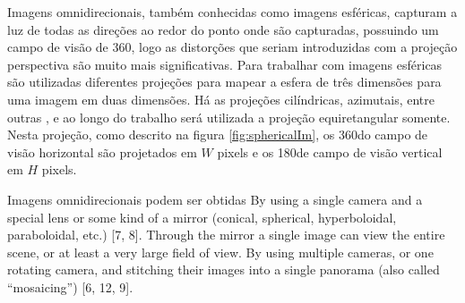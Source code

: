 \documentclass[cic,tc]{iiufrgs}
\begin{document}
\begin{figure}
\begin{center}
{
	}
    \end{center}
    \label{fig:perspectiveProj}
\end{figure}

Imagens omnidirecionais, também conhecidas como imagens esféricas, capturam a luz de todas as direções ao redor do ponto onde são capturadas, possuindo um campo de visão de 360\degree, logo as distorções que seriam introduzidas com a projeção perspectiva são muito mais significativas. Para trabalhar com imagens esféricas são utilizadas diferentes projeções para mapear a esfera de três dimensões para uma imagem em duas dimensões. Há as projeções cilíndricas, azimutais, entre outras , e ao longo do trabalho será utilizada a projeção equiretangular somente. Nesta projeção,  como descrito na figura \ref{fig:sphericalIm}, os 360\degree do campo de visão horizontal são projetados em $W$ pixels e os 180\degree de campo de visão vertical em $H$ pixels.

Imagens omnidirecionais podem ser obtidas
By using a single camera and a special lens or some
kind of a mirror (conical, spherical, hyperboloidal,
paraboloidal, etc.) [7, 8]. Through the mirror a single
image can view the entire scene, or at least a very
large field of view. By using multiple cameras, or one rotating camera,
and stitching their images into a single panorama (also
called “mosaicing”) [6, 12, 9].
\end{document}
